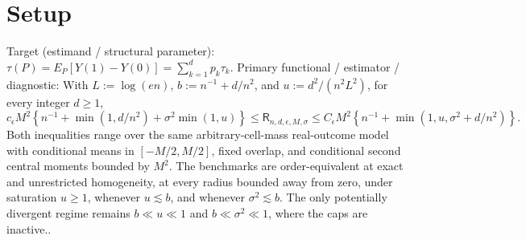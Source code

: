 \documentclass{article}
\begin{document}
\section{Setup}

Target (estimand / structural parameter): \(\tau(P)=E_P[Y(1)-Y(0)]=\sum_{k=1}^{d}p_k\tau_k\).
Primary functional / estimator / diagnostic: With \(L:=\log(en)\), \(b:=n^{-1}+d/n^2\), and \(u:=d^2/(n^2L^2)\), for every integer \(d\ge1\),
\[
 c_{\epsilon}M^2\left\{n^{-1}+\min(1,d/n^2)+\sigma^2\min(1,u)\right\}
 \le\mathsf R_{n,d,\epsilon,M,\sigma}
 \le C_{\epsilon}M^2\left\{n^{-1}+\min(1,u,\sigma^2+d/n^2)\right\}.
\]
Both inequalities range over the same arbitrary-cell-mass real-outcome model with conditional means in \([-M/2,M/2]\), fixed overlap, and conditional second central moments bounded by \(M^2\).  The benchmarks are order-equivalent at exact and unrestricted homogeneity, at every radius bounded away from zero, under saturation \(u\ge1\), whenever \(u\lesssim b\), and whenever \(\sigma^2\lesssim b\).  The only potentially divergent regime remains \(b\ll u\ll1\) and \(b\ll\sigma^2\ll1\), where the caps are inactive..
\end{document}
